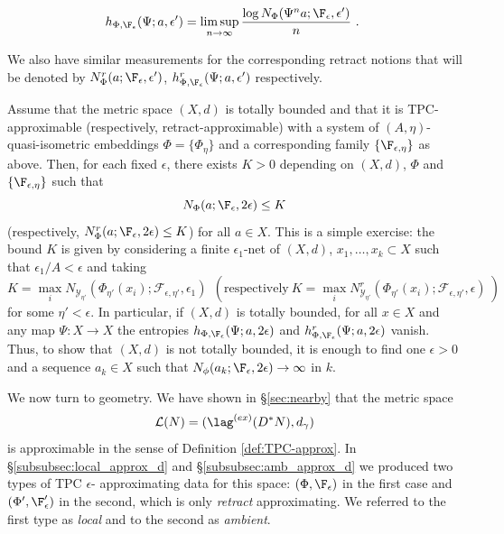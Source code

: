 \begin{equation}\label{eq:cat_entropy2}
h_{\Phi,\F_{\epsilon}}(\Psi;a,\epsilon')=\limsup_{n\to\infty}\frac{\log  N_{\Phi}(\Psi^{n}a;\F_{\epsilon},\epsilon')}{n}~.~
\end{equation}

We also have similar measurements for the corresponding retract notions that will be denoted by  
$N^{r}_{\Phi}(a; \F_{\epsilon},\epsilon')$, $h^{r}_{\Phi,\F_{\epsilon}}(\Psi;a,\epsilon')$
respectively. 
\begin{rem}\label{rem:tb_complex} 
 Assume that the metric space $(X,d)$ is totally bounded and that it is TPC-approximable (respectively, retract-approximable) with a system
  of $(A,\eta)$-quasi-isometric embeddings $\Phi=\{\Phi_{\eta}\}$ and a corresponding family $\{\F_{\epsilon,\eta}\}$ as above. 
Then, for each fixed $\epsilon$, there exists $K >0$ depending on $(X,d)$, $\Phi$ and $\{\F_{\epsilon,\eta}\}$ 
such that $$N_{\Phi}(a;\F_{\epsilon},2\epsilon)\leq K$$ (respectively, $N^{r}_{\Phi}(a;\F_{\epsilon},2\epsilon)\leq K$) 
for all $a\in X$. This is a simple exercise: the bound $K$ is given by considering a finite $\epsilon_{1}$-net of $(X,d)$, $x_{1},\ldots, x_{k}\subset X$
such that $\epsilon_{1}/A < \epsilon$ and  taking $$K=\max_{i} N_{\mathscr{Y}_{\eta'}} (\Phi_{\eta'}(x_{i});\mathcal{F}_{\epsilon,\eta'}, \epsilon_{1}) \ \ (\mathrm{respectively}\ K=\max_{i} N^{r}_{\mathscr{Y}_{\eta'}} (\Phi_{\eta'}(x_{i});\mathcal{F}_{\epsilon,\eta'}, \epsilon) \ )$$  for some $\eta' < \epsilon$. In particular, if $(X,d)$ is totally bounded, 
for all $x\in X$ and any map $\Psi:X\to X$
the entropies $h_{\Phi,\F_{\epsilon}}(\Psi; a, 2\epsilon)$ and $h^{r}_{\Phi,\F_{\epsilon}}(\Psi; a, 2\epsilon)$ vanish. Thus, to show that $(X,d)$ is not totally bounded, it is enough to find one $\epsilon>0$ and a sequence $a_{k}\in X$ such that 
$N_{\phi}(a_{k};\F_{\epsilon}, 2\epsilon)\to \infty$ in $k$.
\end{rem}

We now turn to geometry.  We have shown in \S\ref{sec:nearby} that the metric space $$\mathcal{L}(N)=(\lag^{(ex)}(D^{\ast}N), d_{\gamma})$$ is approximable in the sense of Definition \ref{def:TPC-approx}. 
In \S\ref{subsubsec:local_approx_d} and \S\ref{subsubsec:amb_approx_d} we produced two types of TPC  $\epsilon$- approximating data for this space: $(\Phi, \F_{\epsilon})$ in the first case and $(\Phi', \F'_{\epsilon})$ in the second, which is only {\em retract} approximating. We referred to the first type as {\em local} and to the second as {\em ambient}.

